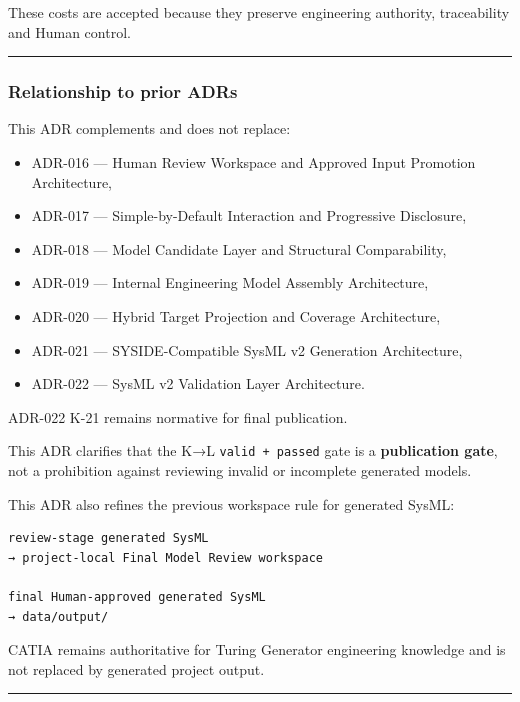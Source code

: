 These costs are accepted because they preserve engineering authority, traceability and Human control.

\begin{center}\rule{0.5\linewidth}{0.5pt}\end{center}

\hypertarget{relationship-to-prior-adrs}{%
\subsubsection{Relationship to prior ADRs}\label{relationship-to-prior-adrs}}

This ADR complements and does not replace:

\begin{itemize}
\tightlist
\item
  ADR-016 --- Human Review Workspace and Approved Input Promotion Architecture,
\item
  ADR-017 --- Simple-by-Default Interaction and Progressive Disclosure,
\item
  ADR-018 --- Model Candidate Layer and Structural Comparability,
\item
  ADR-019 --- Internal Engineering Model Assembly Architecture,
\item
  ADR-020 --- Hybrid Target Projection and Coverage Architecture,
\item
  ADR-021 --- SYSIDE-Compatible SysML v2 Generation Architecture,
\item
  ADR-022 --- SysML v2 Validation Layer Architecture.
\end{itemize}

ADR-022 K-21 remains normative for final publication.

This ADR clarifies that the K→L \texttt{valid\ +\ passed} gate is a \textbf{publication gate}, not a prohibition against reviewing invalid or incomplete generated models.

This ADR also refines the previous workspace rule for generated SysML:

\begin{verbatim}
review-stage generated SysML
→ project-local Final Model Review workspace

final Human-approved generated SysML
→ data/output/
\end{verbatim}

CATIA remains authoritative for Turing Generator engineering knowledge and is not replaced by generated project output.

\begin{center}\rule{0.5\linewidth}{0.5pt}\end{center}

